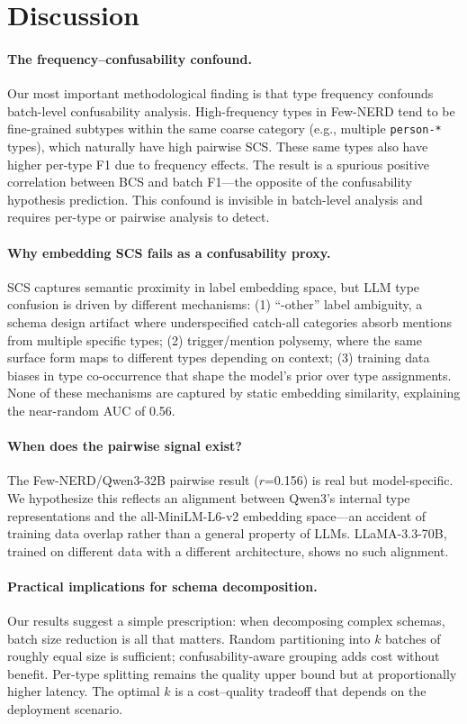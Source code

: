 \documentclass[11pt,a4paper]{article}
\begin{document}
\section{Discussion}

\paragraph{The frequency--confusability confound.}
Our most important methodological finding is that type frequency confounds batch-level confusability analysis.
High-frequency types in Few-NERD tend to be fine-grained subtypes within the same coarse category (e.g., multiple \texttt{person-*} types), which naturally have high pairwise SCS.
These same types also have higher per-type F1 due to frequency effects.
The result is a spurious positive correlation between BCS and batch F1---the opposite of the confusability hypothesis prediction.
This confound is invisible in batch-level analysis and requires per-type or pairwise analysis to detect.

\paragraph{Why embedding SCS fails as a confusability proxy.}
SCS captures semantic proximity in label embedding space, but LLM type confusion is driven by different mechanisms:
(1) ``-other'' label ambiguity, a schema design artifact where underspecified catch-all categories absorb mentions from multiple specific types;
(2) trigger/mention polysemy, where the same surface form maps to different types depending on context;
(3) training data biases in type co-occurrence that shape the model's prior over type assignments.
None of these mechanisms are captured by static embedding similarity, explaining the near-random AUC of 0.56.

\paragraph{When does the pairwise signal exist?}
The Few-NERD/Qwen3-32B pairwise result ($r$=0.156) is real but model-specific.
We hypothesize this reflects an alignment between Qwen3's internal type representations and the all-MiniLM-L6-v2 embedding space---an accident of training data overlap rather than a general property of LLMs.
LLaMA-3.3-70B, trained on different data with a different architecture, shows no such alignment.

\paragraph{Practical implications for schema decomposition.}
Our results suggest a simple prescription: when decomposing complex schemas, batch size reduction is all that matters.
Random partitioning into $k$ batches of roughly equal size is sufficient; confusability-aware grouping adds cost without benefit.
Per-type splitting remains the quality upper bound but at proportionally higher latency.
The optimal $k$ is a cost--quality tradeoff that depends on the deployment scenario.
\end{document}
